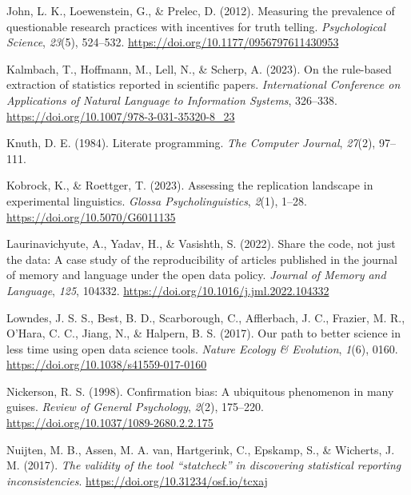 \documentclass[
  doc,
  longtable,
  nolmodern,
  notxfonts,
  notimes,
  colorlinks=true,linkcolor=blue,citecolor=blue,urlcolor=blue]{apa7}
\newlength{\cslhangindent}
\newenvironment{CSLReferences}[2] %
 {\begin{list}{}{%
  \setlength{\itemindent}{0pt}
  \setlength{\leftmargin}{0pt}
  \setlength{\parsep}{0pt}
  \ifodd #1
   \setlength{\leftmargin}{\cslhangindent}
   \setlength{\itemindent}{-1\cslhangindent}
  \fi
  \setlength{\itemsep}{#2\baselineskip}}}
 {\end{list}}
\begin{document}
\begin{CSLReferences}{1}{0}
John, L. K., Loewenstein, G., \& Prelec, D. (2012). Measuring the
prevalence of questionable research practices with incentives for truth
telling. \emph{Psychological Science}, \emph{23}(5), 524--532.
\url{https://doi.org/10.1177/0956797611430953}

Kalmbach, T., Hoffmann, M., Lell, N., \& Scherp, A. (2023). On the
rule-based extraction of statistics reported in scientific papers.
\emph{International Conference on Applications of Natural Language to
Information Systems}, 326--338.
\url{https://doi.org/10.1007/978-3-031-35320-8_23}

Knuth, D. E. (1984). Literate programming. \emph{The Computer Journal},
\emph{27}(2), 97--111.

Kobrock, K., \& Roettger, T. (2023). Assessing the replication landscape
in experimental linguistics. \emph{Glossa Psycholinguistics},
\emph{2}(1), 1--28. \url{https://doi.org/10.5070/G6011135}

Laurinavichyute, A., Yadav, H., \& Vasishth, S. (2022). Share the code,
not just the data: A case study of the reproducibility of articles
published in the journal of memory and language under the open data
policy. \emph{Journal of Memory and Language}, \emph{125}, 104332.
\url{https://doi.org/10.1016/j.jml.2022.104332}

Lowndes, J. S. S., Best, B. D., Scarborough, C., Afflerbach, J. C.,
Frazier, M. R., O'Hara, C. C., Jiang, N., \& Halpern, B. S. (2017). Our
path to better science in less time using open data science tools.
\emph{Nature Ecology \& Evolution}, \emph{1}(6), 0160.
\url{https://doi.org/10.1038/s41559-017-0160}

Nickerson, R. S. (1998). Confirmation bias: A ubiquitous phenomenon in
many guises. \emph{Review of General Psychology}, \emph{2}(2), 175--220.
\url{https://doi.org/10.1037/1089-2680.2.2.175}

Nuijten, M. B., Assen, M. A. van, Hartgerink, C., Epskamp, S., \&
Wicherts, J. M. (2017). \emph{The validity of the tool {``statcheck''}
in discovering statistical reporting inconsistencies}.
\url{https://doi.org/10.31234/osf.io/tcxaj}


\end{CSLReferences}
\end{document}

